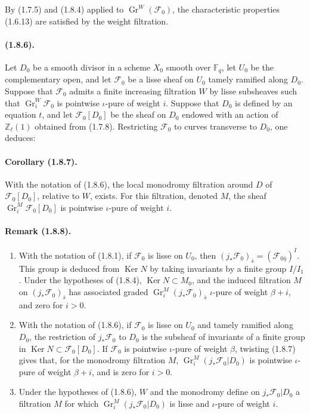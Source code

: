 \documentclass[11pt]{article}
\theoremstyle{remark}
\newcommand{\ZZ}{\mathbb{Z}}
\newcommand{\Fq}{\mathbb{F}_q}
\newcommand{\Gr}{\operatorname{Gr}}
\newcommand{\Ker}{\operatorname{Ker}}
\begin{document}
By (1.7.5) and (1.8.4) applied to $\Gr^W(\mathcal F_0)$, the characteristic properties (1.6.13) are satisfied by the weight filtration.

\paragraph{(1.8.6).}
Let $D_0$ be a smooth divisor in a scheme $X_0$ smooth over $\Fq$, let $U_0$ be the complementary open, and let $\mathcal F_0$ be a lisse sheaf on $U_0$ tamely ramified along $D_0$. Suppose that $\mathcal F_0$ admits a finite increasing filtration $W$ by lisse subsheaves such that $\Gr^W_i\mathcal F_0$ is pointwise $\iota$-pure of weight $i$. Suppose that $D_0$ is defined by an equation $t$, and let $\mathcal F_0[D_0]$ be the sheaf on $D_0$ endowed with an action of $\ZZ_\ell(1)$ obtained from (1.7.8). Restricting $\mathcal F_0$ to curves transverse to $D_0$, one deduces:

\paragraph{Corollary (1.8.7).}
With the notation of (1.8.6), the local monodromy filtration around $D$ of $\mathcal F_0[D_0]$, relative to $W$, exists. For this filtration, denoted $M$, the sheaf $\Gr^M_i\mathcal F_0[D_0]$ is pointwise $\iota$-pure of weight $i$.

\paragraph{Remark (1.8.8).}
\begin{enumerate}[label=\arabic*)]
\item With the notation of (1.8.1), if $\mathcal F_0$ is lisse on $U_0$, then $(j_{*}\mathcal F_0)_{\bar s}=(\mathcal F_{0\bar\eta})^I$. This group is deduced from $\Ker N$ by taking invariants by a finite group $I/I_1$. Under the hypotheses of (1.8.4), $\Ker N\subset M_0$, and the induced filtration $M$ on $(j_{*}\mathcal F_0)_{\bar s}$ has associated graded $\Gr^M_i(j_{*}\mathcal F_0)_{\bar s}$ $\iota$-pure of weight $\beta+i$, and zero for $i>0$.
\item With the notation of (1.8.6), if $\mathcal F_0$ is lisse on $U_0$ and tamely ramified along $D_0$, the restriction of $j_{*}\mathcal F_0$ to $D_0$ is the subsheaf of invariants of a finite group in $\Ker N\subset\mathcal F_0[D_0]$. If $\mathcal F_0$ is pointwise $\iota$-pure of weight $\beta$, twisting (1.8.7) gives that, for the monodromy filtration $M$, $\Gr^M_i(j_{*}\mathcal F_0|D_0)$ is pointwise $\iota$-pure of weight $\beta+i$, and is zero for $i>0$.
\item Under the hypotheses of (1.8.6), $W$ and the monodromy define on $j_{*}\mathcal F_0|D_0$ a filtration $M$ for which $\Gr^M_i(j_{*}\mathcal F_0|D_0)$ is lisse and $\iota$-pure of weight $i$.
\end{enumerate}
\end{document}
